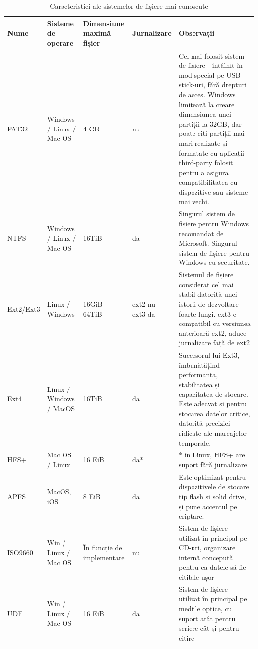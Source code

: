 \begin{table}[htb]
  \scriptsize
  \begin{center}
    \begin{tabular}{ p{} p{} p{} p{} p{} }
      \toprule
        \textbf{Nume} &
        \textbf{Sisteme de operare} &
        \textbf{Dimensiune maximă fișier} &
        \textbf{Jurnalizare} &
        \textbf{Observații} \\
      \midrule
        FAT32 &
        Windows / Linux / Mac OS &
        4 GB &
        nu &
        Cel mai folosit sistem de fișiere - întâlnit în mod special pe USB stick-uri, fără drepturi de acces.
        Windows limitează la creare dimensiunea unei partiții la 32GB, dar poate citi partiții mai mari realizate și formatate cu aplicații third-party folosit pentru a asigura compatibilitatea cu dispozitive sau sisteme mai vechi. \\
      \midrule
        NTFS &
        Windows / Linux / Mac OS &
        16TiB &
        da &
        Singurul sistem de fișiere pentru Windows recomandat de Microsoft.
        Singurul sistem de fișiere pentru Windows cu securitate. \\
      \midrule
        Ext2/Ext3 &
        Linux / Windows &
        16GiB - 64TiB &
        ext2-nu ext3-da &
        Sistemul de fișiere considerat cel mai stabil datorită unei istorii de dezvoltare foarte lungi.
        ext3 e compatibil cu versiunea anterioară ext2, aduce jurnalizare față de ext2 \\
      \midrule
        Ext4 &
        Linux / Windows / MacOS &
        16TiB &
        da &
        Succesorul lui Ext3, îmbunătățind performanța, stabilitatea și capacitatea de stocare.
        Este adecvat și pentru stocarea datelor critice, datorită preciziei ridicate ale marcajelor temporale. \\
      \midrule
        HFS+ &
        Mac OS / Linux &
        16 EiB &
        da* &
        * în Linux, HFS+ are suport fără jurnalizare \\
      \midrule
        APFS &
        MacOS, iOS &
        8 EiB &
        da &
        Este optimizat pentru dispozitivele de stocare tip flash și solid drive, și pune accentul pe criptare. \\
      \midrule
        ISO9660 &
        Win / Linux / Mac OS &
        În funcție de implementare &
        nu &
        Sistem de fișiere utilizat în principal pe CD-uri, organizare internă concepută pentru ca datele să fie citibile ușor \\
      \midrule
        UDF &
        Win / Linux / Mac OS &
        16 EiB &
        da &
        Sistem de fișiere utilizat în principal pe mediile optice, cu suport atât pentru scriere cât și pentru citire \\
      \bottomrule
    \end{tabular}
  \end{center}
  \caption{Caracteristici ale sistemelor de fișiere mai cunoscute}
  \label{table:fs:details}
\end{table}

